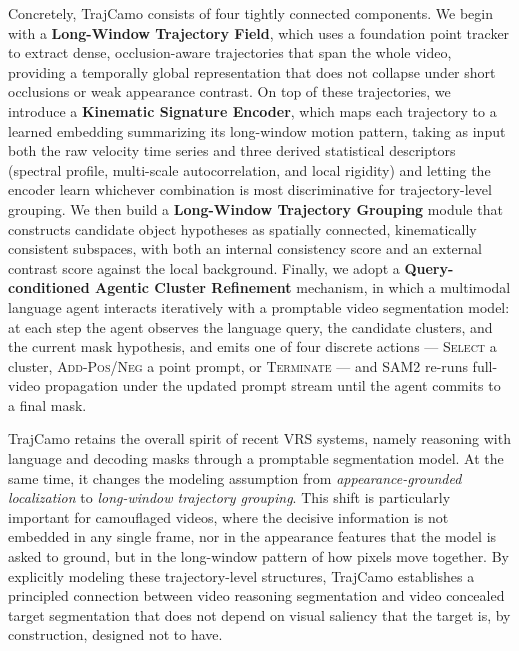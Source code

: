 \documentclass[11pt]{article}
\begin{document}
Concretely, TrajCamo consists of four tightly connected components.
We begin with a \textbf{Long-Window Trajectory Field}, which uses a foundation point tracker to extract dense, occlusion-aware trajectories that span the whole video, providing a temporally global representation that does not collapse under short occlusions or weak appearance contrast.
On top of these trajectories, we introduce a \textbf{Kinematic Signature Encoder}, which maps each trajectory to a learned embedding summarizing its long-window motion pattern, taking as input both the raw velocity time series and three derived statistical descriptors (spectral profile, multi-scale autocorrelation, and local rigidity) and letting the encoder learn whichever combination is most discriminative for trajectory-level grouping.
We then build a \textbf{Long-Window Trajectory Grouping} module that constructs candidate object hypotheses as spatially connected, kinematically consistent subspaces, with both an internal consistency score and an external contrast score against the local background.
Finally, we adopt a \textbf{Query-conditioned Agentic Cluster Refinement} mechanism, in which a multimodal language agent interacts iteratively with a promptable video segmentation model: at each step the agent observes the language query, the candidate clusters, and the current mask hypothesis, and emits one of four discrete actions --- \textsc{Select} a cluster, \textsc{Add-Pos}/\textsc{Neg} a point prompt, or \textsc{Terminate} --- and SAM2 re-runs full-video propagation under the updated prompt stream until the agent commits to a final mask.

TrajCamo retains the overall spirit of recent VRS systems, namely reasoning with language and decoding masks through a promptable segmentation model.
At the same time, it changes the modeling assumption from \emph{appearance-grounded localization} to \emph{long-window trajectory grouping}.
This shift is particularly important for camouflaged videos, where the decisive information is not embedded in any single frame, nor in the appearance features that the model is asked to ground, but in the long-window pattern of how pixels move together.
By explicitly modeling these trajectory-level structures, TrajCamo establishes a principled connection between video reasoning segmentation and video concealed target segmentation that does not depend on visual saliency that the target is, by construction, designed not to have.
\end{document}
